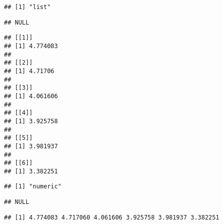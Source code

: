\documentclass[krantz2]{krantz}\usepackage{knitr}%
\begin{document}
\begin{knitrout}\footnotesize
{}\color{fgcolor}\begin{kframe}
\begin{alltt}
\hlstd{(}\hlstd{)} 
 \hlkwb{<-} \hlstd{(}\hlstd{)} 
 \hlkwb{<-} \hlstd{(}\hlstd{,} \hlstd{) \{} \hlopt{+} 
 \hlkwb{<-} \hlstd{(}     \hlstd{=} \hlstd{)}
\end{alltt}
\begin{verbatim}
## [1] "list"
\end{verbatim}
\begin{alltt}
\end{alltt}
\begin{verbatim}
## NULL
\end{verbatim}
\begin{alltt}
\end{alltt}
\begin{verbatim}
## [[1]]
## [1] 4.774083
## 
## [[2]]
## [1] 4.71706
## 
## [[3]]
## [1] 4.061606
## 
## [[4]]
## [1] 3.925758
## 
## [[5]]
## [1] 3.981937
## 
## [[6]]
## [1] 3.382251
\end{verbatim}
\end{kframe}
\end{knitrout}

\begin{knitrout}\footnotesize
{}\color{fgcolor}\begin{kframe}
\begin{alltt}
 \hlkwb{<-} \hlstd{(}     \hlstd{=} \hlstd{)}
\end{alltt}
\begin{verbatim}
## [1] "numeric"
\end{verbatim}
\begin{alltt}
\end{alltt}
\begin{verbatim}
## NULL
\end{verbatim}
\begin{alltt}
\end{alltt}
\begin{verbatim}
## [1] 4.774083 4.717060 4.061606 3.925758 3.981937 3.382251
\end{verbatim}
\end{kframe}
\end{knitrout}
\end{document}

